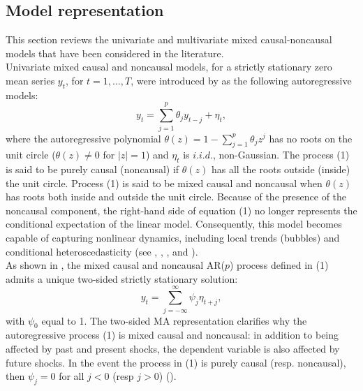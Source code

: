 \documentclass[<1p>]{elsarticle} %
\begin{document}
\subsection{Model representation}
This section reviews the univariate and multivariate mixed causal-noncausal models that have been considered in the literature.\\
\indent Univariate mixed causal and noncausal models, for a strictly stationary zero mean series $y_t$, for $t=1, \dots, T$, were introduced by \cite{breidt1991maximum} as the following autoregressive models:
\begin{equation}
y_{t}=\sum_{j=1}^{p}\theta_{j}y_{t-j}+\eta_{t},%
\end{equation}
where the autoregressive polynomial $\theta(z)=1-\sum_{j=1}^{p}\theta_{j}%
z^{j}$ has no roots on the unit circle ($\theta (z) \neq 0$ for $|z|=1$) and $\eta_t$ is $i.i.d.$, non-Gaussian. The process (1) is said to be purely causal (noncausal) if $\theta(z)$ has all the roots outside (inside) the unit circle. Process (1) is said to be mixed causal and noncausal when $\theta(z)$ has roots both inside and outside the unit circle. Because of the presence of the noncausal component, the right-hand side of equation (1) no longer represents the conditional expectation of the linear model. Consequently, this model becomes capable of capturing nonlinear dynamics, including local trends (bubbles) and conditional heteroscedasticity (see \cite{breidt1991maximum}, \cite{lanne2011noncausal}, \cite{hencic2015noncausal}, and \cite{gourieroux2018misspecification}).\\
\indent As shown in \cite{breid1991maximum}, the mixed causal and noncausal AR($p$) process defined in (1) admits a unique two-sided strictly stationary solution:
\begin{equation}
    y_t = \sum_{j=-\infty}^{\infty} \psi_j \eta_{t+j},
\end{equation}
with $\psi_0$ equal to 1. The two-sided MA representation clarifies why the autoregressive process (1) is mixed causal and noncausal: in addition to being affected by past and present shocks, the dependent variable is also affected by future shocks. In the event the process in (1) is purely causal (resp. noncausal), then $\psi_j = 0$ for all $j < 0$ (resp $j > 0$) (\cite{breidt1991maximum}).\\
\end{document}
